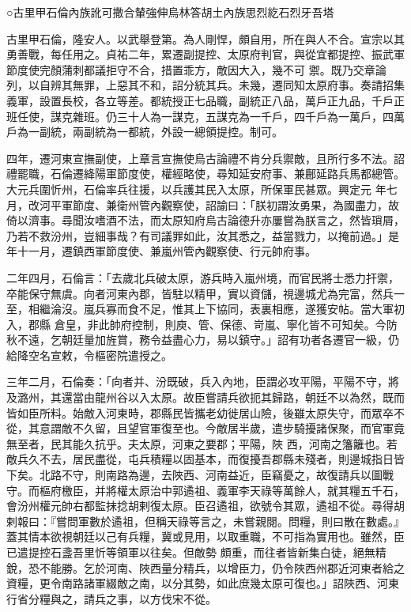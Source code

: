 
\begin{pinyinscope}

 ○古里甲石倫內族訛可撒合輦強伸烏林答胡土內族思烈紇石烈牙吾塔



 古里甲石倫，隆安人。以武舉登第。為人剛悍，頗自用，所在與人不合。宣宗以其勇善戰，每任用之。貞祐二年，累遷副提控、太原府判官，與從宜都提控、振武軍節度使完顏蒲刺都議拒守不合，措置乖方，敵因大入，幾不可
 禦。既乃交章論列，以自辨其無罪，上惡其不和，詔分統其兵。未幾，遷同知太原府事。奏請招集義軍，設置長校，各立等差。都統授正七品職，副統正八品，萬戶正九品，千戶正班任使，謀克雜班。仍三十人為一謀克，五謀克為一千戶，四千戶為一萬戶，四萬戶為一副統，兩副統為一都統，外設一總領提控。制可。



 四年，遷河東宣撫副使，上章言宣撫使烏古論禮不肯分兵禦敵，且所行多不法。詔禮罷職，石倫遷絳陽軍節度使，權經略使，尋知延安府事、兼鄜延路兵馬都總管。大元兵圍忻州，石倫率兵往援，以兵護其民入太原，所保軍民甚眾。興定元
 年七月，改河平軍節度、兼衛州管內觀察使，詔諭曰：「朕初謂汝勇果，為國盡力，故倚以濟事。尋聞汝嗜酒不法，而太原知府烏古論德升亦屢嘗為朕言之，然皆瑣屑，乃若不救汾州，豈細事哉？有司議罪如此，汝其悉之，益當戮力，以掩前過。」是年十一月，遷鎮西軍節度使、兼嵐州管內觀察使、行元帥府事。



 二年四月，石倫言：「去歲北兵破太原，游兵時入嵐州境，而官民將士悉力扞禦，卒能保守無虞。向者河東內郡，皆駐以精甲，實以資儲，視邊城尤為完富，然兵一至，相繼淪沒。嵐兵寡而食不足，惟其上下協同，表裏相應，遂獲安帖。當大軍初入，郡縣
 倉皇，非此帥府控制，則庾、管、保德、岢嵐、寧化皆不可知矣。今防秋不遠，乞朝廷量加旌賞，務令益盡心力，易以鎮守。」詔有功者各遷官一級，仍給降空名宣敕，令樞密院遣授之。



 三年二月，石倫奏：「向者并、汾既破，兵入內地，臣謂必攻平陽，平陽不守，將及潞州，其還當由龍州谷以入太原。故臣嘗請兵欲扼其歸路，朝廷不以為然，既而皆如臣所料。始敵入河東時，郡縣民皆攜老幼徙居山險，後雖太原失守，而眾卒不從，其意謂敵不久留，且望官軍復至也。今敵居半歲，遣步騎擾諸保聚，而官軍竟無至者，民其能久抗乎。夫太原，河東之要郡；平陽，陜
 西，河南之籓籬也。若敵兵久不去，居民盡從，屯兵積糧以固基本，而復擾吾郡縣未殘者，則邊城指日皆下矣。北路不守，則南路為邊，去陜西、河南益近，臣竊憂之，故復請兵以圖戰守。而樞府檄臣，并將權太原治中郭遹祖、義軍李天祿等萬餘人，就其糧五千石，會汾州權元帥右都監抹捻胡剌復太原。臣召遹祖，欲號令其眾，遹祖不從。尋得胡剌報曰：『嘗問軍數於遹祖，但稱天祿等言之，未嘗親閱。問糧，則曰散在數處。』蓋其情本欲視朝廷以己有兵糧，冀或見用，以取重職，不可指為實用也。雖然，臣已遣提控石盞吾里忻等領軍以往矣。但敵勢
 頗重，而往者皆新集白徒，絕無精銳，恐不能勝。乞於河南、陜西量分精兵，以增臣力，仍令陜西州郡近河東者給之資糧，更令南路諸軍綴敵之南，以分其勢，如此庶幾太原可復也。」詔陜西、河東行省分糧與之，請兵之事，以方伐宋不從。




\end{pinyinscope}
